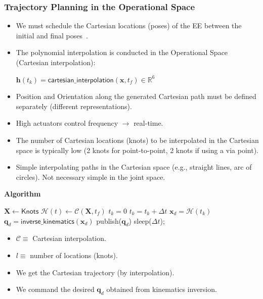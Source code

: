 \documentclass[10pt, aspectratio=169]{beamer}
\theoremstyle{remark}
\theoremstyle{definition}
\begin{document}
\begin{frame}[allowframebreaks]
\frametitle{Trajectory Planning in the Operational Space}

\begin{itemize}
    \item We must schedule the Cartesian locations (poses) of the EE between the initial and final poses~\cite{cartesian_trajectory_planning}.
    \item The polynomial interpolation is conducted in the Operational Space (Cartesian interpolation):
    
    $
    \mathbf{h}(t_k) = \textsf{cartesian\_interpolation}(\mathbf{x}, t_f)\in\mathbb{R}^6
    $
    
    \item Position and Orientation along the generated Cartesian path must be defined separately (different representations).
    \item High actuators control frequency $\rightarrow$ real-time.
    \item The number of Cartesian locations (knots) to be interpolated in the Cartesian space is typically low (2 knots for point-to-point, 2 knots if using a via point).
    \item Simple interpolating paths in the Cartesian space (e.g., straight lines, arc of circles). Not necessary simple in the joint space.
\end{itemize}

\framebreak

\textbf{\textcolor{uma_blue_dark}{Algorithm}}

\begin{minipage}[T!]{.47\linewidth}
\begin{algorithm}[H]
	$\mathbf{X} \gets \textsf{Knots}$\;
    $\mathcal{H}(t) \gets \mathcal{C}(\mathbf{X}, t_f)$\;
    $t_k = 0$\;
 	{
        $t_k = t_k + \Delta t$\;
        $\mathbf{x}_d = \mathcal{H}(t_k)$\;
        $\mathbf{q}_{d} =  \textsf{inverse\_kinematics}(\mathbf{x}_d)$\;
        publish($\mathbf{q}_{d}$)\;
        sleep($\Delta t$);
  	}
\end{algorithm}
\end{minipage}
\begin{minipage}[T!]{.42\linewidth}
\begin{itemize}
    \item $\mathcal{C}\equiv$ Cartesian interpolation.
    \item $l \equiv$ number of locations (knots).
    \item We get the Cartesian trajectory (by interpolation).
    \item We command the desired $\mathbf{q}_{d}$ obtained from kinematics inversion.
\end{itemize}
\end{minipage}
\end{frame}
\end{document}
